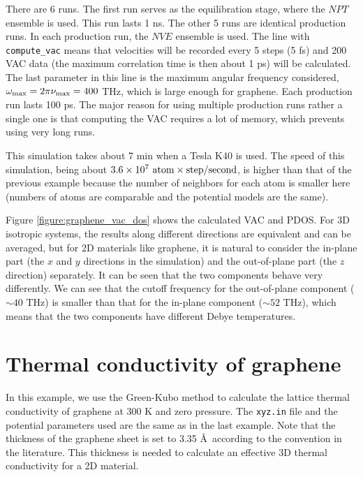 \documentclass[12pt,a4paper]{report}
\begin{document}
There are 6 runs. The first run serves as the equilibration stage, where the $NPT$ ensemble is used. This run lasts 1 ns. The other 5 runs are identical production runs. In each production run, the $NVE$ ensemble is used. The line with \verb"compute_vac" means that velocities will be recorded every 5 steps (5 fs) and 200 VAC data (the maximum correlation time is then about 1 ps) will be calculated. The last parameter in this line is the maximum angular frequency considered, $\omega_{\rm max} = 2\pi\nu_{\rm max} =400$ THz, which is large enough for graphene. Each production run lasts 100 ps. The major reason for using multiple production runs rather a single one is that computing the VAC requires a lot of memory, which prevents using very long runs.

This simulation takes about 7 min when a Tesla K40 is used.
The speed of this simulation, being about $3.6\times 10^7 ~\textmd{atom} \times \textmd{step} / \textmd{second}$, is higher than that of the previous example because the number of neighbors for each atom is smaller here (numbers of atoms are comparable and the potential models are the same).



Figure \ref{figure:graphene_vac_dos} shows the calculated VAC and PDOS.
For 3D isotropic systems, the results along different directions are equivalent and can be averaged, but for 2D materials like graphene, it is natural to consider the in-plane part (the $x$ and $y$ directions in the simulation) and the out-of-plane part (the $z$ direction) separately. It can be seen that the two components behave very differently. We can see that the cutoff frequency for the out-of-plane component ($\sim4 0$ THz) is smaller than that for the in-plane component ($\sim 52$ THz), which means that the two components have different Debye temperatures.


\section{Thermal conductivity of graphene}


In this example, we use the Green-Kubo method to calculate the lattice thermal conductivity of graphene at 300 K and zero pressure. The \verb"xyz.in" file and the potential parameters used are the same as in the last example. Note that the thickness of the graphene sheet is set to 3.35 \AA ~according to the convention in the literature. This thickness is needed to calculate an effective 3D thermal conductivity for a 2D material.
\end{document}
